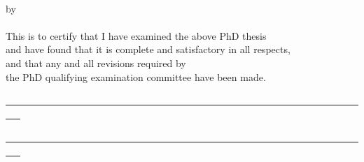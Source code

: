 \null{}
\begin{center}
{\Large \thesistitle}\\
\vspace{23mm}
by\\
\vspace{3mm}
\thesisauthor\\
\vspace{5mm}
This is to certify that I have examined the above PhD thesis\\
and have found that it is complete and satisfactory in all respects,\\
and that any and all revisions required by\\
the PhD qualifying examination committee have been made.
\end{center}

\vspace{20mm}

\begin{center}
\underline{~~~~~~~~~~~~~~~~~~~~~~~~~~~~~~~~~~~~~~~~~~~~~~~~~~~~~~~~~~~~~~~~~~~~~~~~~~~ }\\
\supervisorinfo
\end{center}

\vspace{20mm}

\begin{center}
\underline{~~~~~~~~~~~~~~~~~~~~~~~~~~~~~~~~~~~~~~~~~~~~~~~~~~~~~~~~~~~~~~~~~~~~~~~~~~~ }\\
\depheadinfo
\end{center}
\vspace{5mm}
\begin{center}
\departmentname\\
\vspace{5mm}
\signdate
\end{center}
